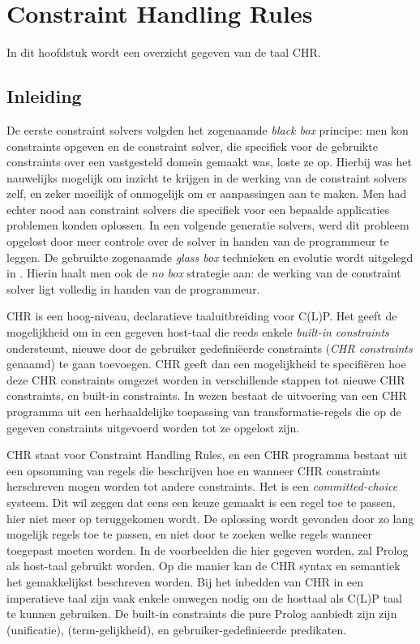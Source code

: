 \chapter{Constraint Handling Rules} \label{chap:chr}

In dit hoofdstuk wordt een overzicht gegeven van de taal CHR.

\section{Inleiding}

De eerste constraint solvers volgden het zogenaamde {\em black box} principe: men kon constraints opgeven en de constraint solver, die specifiek voor de gebruikte constraints over een vastgesteld domein gemaakt was, loste ze op. Hierbij was het nauwelijks mogelijk om inzicht te krijgen in de werking van de constraint solvers zelf, en zeker moeilijk of onmogelijk om er aanpassingen aan te maken. Men had echter nood aan constraint solvers die specifiek voor een bepaalde applicaties problemen konden oplossen. In een volgende generatie solvers, werd dit probleem opgelost door meer controle over de solver in handen van de programmeur te leggen. De gebruikte zogenaamde  {\em glass box} technieken en evolutie wordt uitgelegd in \cite{chr}. Hierin haalt men ook de {\em no box} strategie aan: de werking van de constraint solver ligt volledig in handen van de programmeur.

CHR is een hoog-niveau, declaratieve taaluitbreiding voor C(L)P. Het geeft de mogelijkheid om in een gegeven host-taal die reeds enkele {\em built-in constraints} ondersteunt, nieuwe door de gebruiker gedefini\"eerde constraints ({\em CHR constraints} genaamd) te gaan toevoegen. CHR geeft dan een mogelijkheid te specifi\"eren hoe deze CHR constraints omgezet worden in verschillende stappen tot nieuwe CHR constraints, en built-in constraints. In wezen bestaat de uitvoering van een CHR programma uit een herhaaldelijke toepassing van transformatie-regels die op de gegeven constraints uitgevoerd worden tot ze opgelost zijn.

CHR staat voor Constraint Handling Rules, en een CHR programma bestaat uit een opsomming van regels die beschrijven hoe en wanneer CHR constraints herschreven mogen worden tot andere constraints. Het is een {\em committed-choice} systeem. Dit wil zeggen dat eens een keuze gemaakt is een regel toe te passen, hier niet meer op teruggekomen wordt. De oplossing wordt gevonden door zo lang mogelijk regels toe te passen, en niet door te zoeken welke regels wanneer toegepast moeten worden. In de voorbeelden die hier gegeven worden, zal Prolog als host-taal gebruikt worden. Op die manier kan de CHR syntax en semantiek het gemakkelijkst beschreven worden. Bij het inbedden van CHR in een imperatieve taal zijn vaak enkele omwegen nodig om de hosttaal als C(L)P taal te kunnen gebruiken. De built-in constraints die pure Prolog aanbiedt zijn zijn \code{=} (unificatie), \code{==} (term-gelijkheid), en gebruiker-gedefinieerde predikaten.

